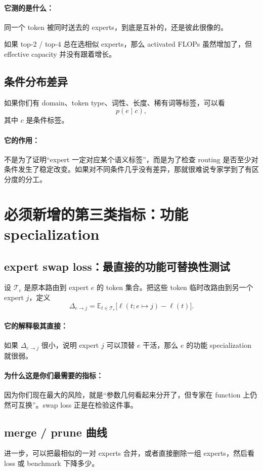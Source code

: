 \documentclass[11pt]{article}
\begin{document}
\paragraph{它测的是什么：}
同一个 token 被同时送去的 experts，到底是互补的，还是彼此很像的。

如果 top-$2$ / top-$4$ 总在选相似 experts，那么 activated FLOPs 虽然增加了，但 effective capacity 并没有跟着增长。

\subsection{条件分布差异}
如果你们有 domain、token type、词性、长度、稀有词等标签，可以看
\[
    p(e\mid c),
\]
其中 $c$ 是条件标签。

\paragraph{它的作用：}
不是为了证明“expert 一定对应某个语义标签”，而是为了检查 routing 是否至少对条件发生了稳定改变。如果对不同条件几乎没有差异，那就很难说专家学到了有区分度的分工。

\section{必须新增的第三类指标：功能 specialization}

\subsection{expert swap loss：最直接的功能可替换性测试}
设 $\mathcal T_e$ 是原本路由到 expert $e$ 的 token 集合。把这些 token 临时改路由到另一个 expert $j$，定义
\[
    \Delta_{e\to j}=\mathbb E_{t\in\mathcal T_e}
    \bigl[\ell(t; e\mapsto j)-\ell(t)\bigr].
\]

\paragraph{它的解释极其直接：}
如果 $\Delta_{e\to j}$ 很小，说明 expert $j$ 可以顶替 $e$ 干活，那么 $e$ 的功能 specialization 就很弱。

\paragraph{为什么这是你们最需要的指标：}
因为你们现在最大的风险，就是“参数几何看起来分开了，但专家在 function 上仍然可互换”。swap loss 正是在检验这件事。

\subsection{merge / prune 曲线}
进一步，可以把最相似的一对 experts 合并，或者直接删除一组 experts，然后看 loss 或 benchmark 下降多少。
\end{document}
